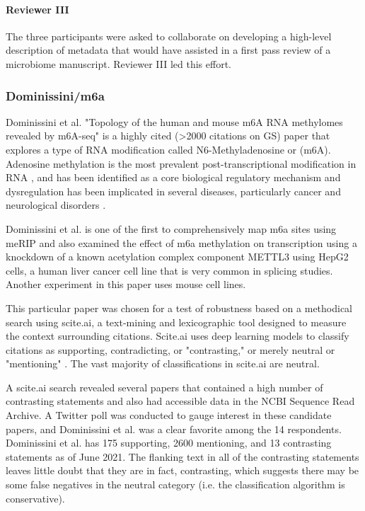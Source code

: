 \documentclass{drexelthesis}
\begin{document}
\paragraph{Reviewer III}

The three participants were asked to collaborate on developing a high-level description of metadata that would have assisted in a first pass review of a microbiome manuscript. Reviewer III led this effort.

\subsubsection{Dominissini/m6a}

Dominissini et al. "Topology of the human and mouse m6A RNA methylomes revealed by m6A-seq" is a highly cited (>2000 citations on GS) paper that explores a type of RNA modification called N6-Methyladenosine or (m6A). Adenosine methylation is the most prevalent post-transcriptional modification in RNA \cite{Zhang2019-uh}, and has been identified as a core biological regulatory mechanism and dysregulation has been implicated in several diseases, particularly cancer and neurological disorders \cite{Jiang2021-kv}.

Dominissini et al. is one of the first to comprehensively map m6a sites using meRIP and also examined the effect of m6a methylation on transcription using a knockdown of a known acetylation complex component METTL3 using HepG2 cells, a human liver cancer cell line that is very common in splicing studies. Another experiment in this paper uses mouse cell lines. 

This particular paper was chosen for a test of robustness based on a methodical search using scite.ai, a text-mining and lexicographic tool designed to measure the context surrounding citations. Scite.ai uses deep learning models to classify citations as supporting, contradicting, or "contrasting," or merely neutral or "mentioning" \cite{Nicholson_undated-ry}. The vast majority of classifications in scite.ai are neutral. 

A scite.ai search revealed several papers that contained a high number of contrasting statements and also had accessible data in the NCBI Sequence Read Archive. A Twitter poll was conducted to gauge interest in these candidate papers, and Dominissini et al. was a clear favorite among the 14 respondents. Dominissini et al. has 175 supporting, 2600 mentioning, and 13 contrasting statements as of June 2021. The flanking text in all of the contrasting statements leaves little doubt that they are in fact, contrasting, which suggests there may be some false negatives in the neutral category (i.e. the classification algorithm is conservative).
\end{document}
